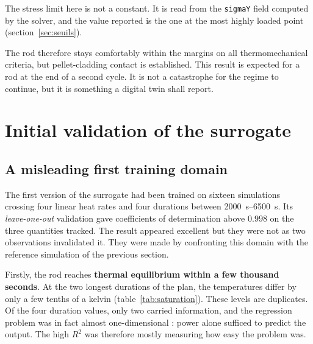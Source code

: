 \noindent
The stress limit here is not a constant. It is read from the \texttt{sigmaY}
field computed by the solver, and the value reported is the one at the most
highly loaded point (section~\ref{sec:seuils}).

The rod therefore stays comfortably within the margins on all thermomechanical
criteria, but pellet-cladding contact is established. This result is expected
for a rod at the end of a second cycle. It is not a catastrophe for the regime to continue, but it is something a digital twin shall report.

\section{Initial validation of the surrogate}
\label{sec:validation-emulateur}

\subsection{A misleading first training domain}

The first version of the surrogate had been trained on sixteen simulations
crossing four linear heat rates and four durations between
\SIrange{2000}{6500}{\second}. Its \textit{leave-one-out} validation gave
coefficients of determination above $0.998$ on the three quantities tracked. The
result appeared excellent but they were not as two observations invalidated it. They were made by confronting this domain with the reference
simulation of the previous section.

Firstly, the rod reaches \textbf{thermal equilibrium within a few thousand
seconds}. At the two longest durations of the plan, the temperatures differ by
only a few tenths of a kelvin (table~\ref{tab:saturation}). These levels are
duplicates. Of the four duration values, only two carried information, and the
regression problem was in fact almost one-dimensional : power alone sufficed to
predict the output. The high $R^2$ was therefore mostly measuring how easy the
problem was.

